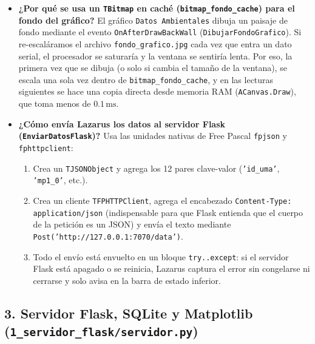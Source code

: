 \documentclass[11pt,a4paper]{article}
\begin{document}
\begin{itemize}[leftmargin=1.5em]
    \item \textbf{¿Por qué se usa un \texttt{TBitmap} en caché (\texttt{bitmap\_fondo\_cache}) para el fondo del gráfico?}
    El gráfico \texttt{Datos Ambientales} dibuja un paisaje de fondo mediante el evento \texttt{OnAfterDrawBackWall} (\texttt{DibujarFondoGrafico}). Si re-escaláramos el archivo \texttt{fondo\_grafico.jpg} cada vez que entra un dato serial, el procesador se saturaría y la ventana se sentiría lenta. Por eso, la primera vez que se dibuja (o solo si cambia el tamaño de la ventana), se escala una sola vez dentro de \texttt{bitmap\_fondo\_cache}, y en las lecturas siguientes se hace una copia directa desde memoria RAM (\texttt{ACanvas.Draw}), que toma menos de $0.1\,\text{ms}$.
    
    \item \textbf{¿Cómo envía Lazarus los datos al servidor Flask (\texttt{EnviarDatosFlask})?}
    Usa las unidades nativas de Free Pascal \texttt{fpjson} y \texttt{fphttpclient}:
    \begin{enumerate}
        \item Crea un \texttt{TJSONObject} y agrega los 12 pares clave-valor (\texttt{'id\_uma'}, \texttt{'mp1\_0'}, etc.).
        \item Crea un cliente \texttt{TFPHTTPClient}, agrega el encabezado \texttt{Content-Type: application/json} (indispensable para que Flask entienda que el cuerpo de la petición es un JSON) y envía el texto mediante \texttt{Post('http://127.0.0.1:7070/data')}.
        \item Todo el envío está envuelto en un bloque \texttt{try..except}: si el servidor Flask está apagado o se reinicia, Lazarus captura el error sin congelarse ni cerrarse y solo avisa en la barra de estado inferior.
    \end{enumerate}
\end{itemize}

\subsection{3. Servidor Flask, SQLite y Matplotlib (\texttt{1\_servidor\_flask/servidor.py})}
\end{document}
